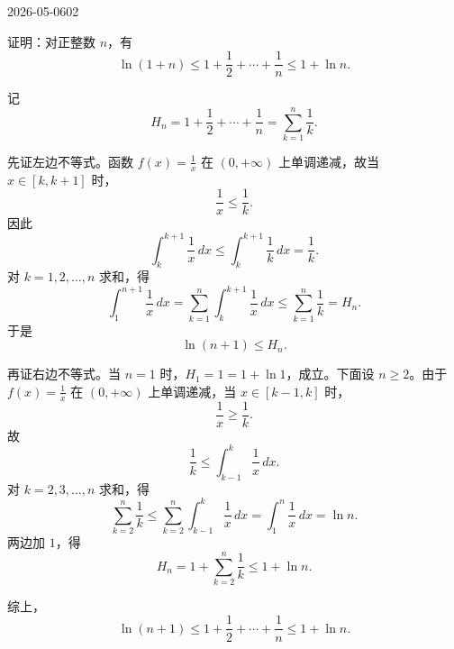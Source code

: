 \begin{mistake}{2026-05-06}{02}

\begin{problemcontent}
证明：对正整数 \(n\)，有
\[
\ln(1+n)\le 1+\frac12+\cdots+\frac1n\le 1+\ln n.
\]
\end{problemcontent}

\begin{solutioncontent}
记
\[
H_n=1+\frac12+\cdots+\frac1n=\sum_{k=1}^n\frac1k.
\]

先证左边不等式。函数 \(f(x)=\frac1x\) 在 \((0,+\infty)\) 上单调递减，故当 \(x\in[k,k+1]\) 时，
\[
\frac1x\le \frac1k.
\]
因此
\[
\int_k^{k+1}\frac1x\,dx\le \int_k^{k+1}\frac1k\,dx=\frac1k.
\]
对 \(k=1,2,\ldots,n\) 求和，得
\[
\int_1^{n+1}\frac1x\,dx
=\sum_{k=1}^n\int_k^{k+1}\frac1x\,dx
\le \sum_{k=1}^n\frac1k=H_n.
\]
于是
\[
\ln(n+1)\le H_n.
\]

再证右边不等式。当 \(n=1\) 时，\(H_1=1=1+\ln1\)，成立。下面设 \(n\ge2\)。由于 \(f(x)=\frac1x\) 在 \((0,+\infty)\) 上单调递减，当 \(x\in[k-1,k]\) 时，
\[
\frac1x\ge \frac1k.
\]
故
\[
\frac1k\le \int_{k-1}^{k}\frac1x\,dx.
\]
对 \(k=2,3,\ldots,n\) 求和，得
\[
\sum_{k=2}^n\frac1k
\le \sum_{k=2}^n\int_{k-1}^{k}\frac1x\,dx
=\int_1^n\frac1x\,dx
=\ln n.
\]
两边加 \(1\)，得
\[
H_n=1+\sum_{k=2}^n\frac1k\le 1+\ln n.
\]

综上，
\[
\ln(n+1)\le 1+\frac12+\cdots+\frac1n\le 1+\ln n.
\]
\end{solutioncontent}


\end{mistake}
